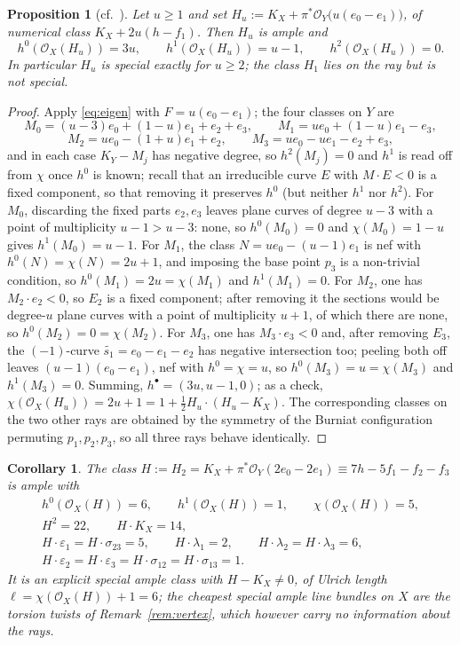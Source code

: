 \documentclass[10pt,a4paper]{amsart}
\newtheorem{proposition}[theorem]{Proposition}
\newtheorem{corollary}[theorem]{Corollary}
\newcommand{\OO}{\mathcal{O}}
\newcommand{\len}{\ell}
\begin{document}
\begin{proposition}[cf.\ {\cite[Prop.~4.27]{Cho26}}]\label{prop:ray}
Let $u\ge1$ and set $H_u:=K_X+\pi^*\OO_Y\bigl(u(e_0-e_1)\bigr)$, of numerical class $K_X+2u(h-f_1)$. Then $H_u$ is ample and
\[
h^0(\OO_X(H_u))=3u,\qquad h^1(\OO_X(H_u))=u-1,\qquad h^2(\OO_X(H_u))=0 .
\]
In particular $H_u$ is special exactly for $u\ge2$; the class $H_1$ lies on the ray but is not special.
\end{proposition}

\begin{proof}
Apply \eqref{eq:eigen} with $F=u(e_0-e_1)$; the four classes on $Y$ are
\[
M_0=(u-3)e_0+(1-u)e_1+e_2+e_3,\qquad M_1=ue_0+(1-u)e_1-e_3,
\]
\[
M_2=ue_0-(1+u)e_1+e_2,\qquad M_3=ue_0-ue_1-e_2+e_3,
\]
and in each case $K_Y-M_j$ has negative degree, so $h^2(M_j)=0$ and $h^1$ is read off from $\chi$ once $h^0$ is known; recall that an irreducible curve $E$ with $M\cdot E<0$ is a fixed component, so that removing it preserves $h^0$ (but neither $h^1$ nor $h^2$). For $M_0$, discarding the fixed parts $e_2,e_3$ leaves plane curves of degree $u-3$ with a point of multiplicity $u-1>u-3$: none, so $h^0(M_0)=0$ and $\chi(M_0)=1-u$ gives $h^1(M_0)=u-1$. For $M_1$, the class $N=ue_0-(u-1)e_1$ is nef with $h^0(N)=\chi(N)=2u+1$, and imposing the base point $p_3$ is a non-trivial condition, so $h^0(M_1)=2u=\chi(M_1)$ and $h^1(M_1)=0$. For $M_2$, one has $M_2\cdot e_2<0$, so $E_2$ is a fixed component; after removing it the sections would be degree-$u$ plane curves with a point of multiplicity $u+1$, of which there are none, so $h^0(M_2)=0=\chi(M_2)$. For $M_3$, one has $M_3\cdot e_3<0$ and, after removing $E_3$, the $(-1)$-curve $\widetilde{s_1}=e_0-e_1-e_2$ has negative intersection too; peeling both off leaves $(u-1)(e_0-e_1)$, nef with $h^0=\chi=u$, so $h^0(M_3)=u=\chi(M_3)$ and $h^1(M_3)=0$. Summing, $h^\bullet=(3u,u-1,0)$; as a check, $\chi(\OO_X(H_u))=2u+1=1+\tfrac12H_u\cdot(H_u-K_X)$. The corresponding classes on the two other rays are obtained by the symmetry of the Burniat configuration permuting $p_1,p_2,p_3$, so all three rays behave identically.
\end{proof}

\begin{corollary}\label{cor:candidate}
The class $H:=H_2=K_X+\pi^*\OO_Y(2e_0-2e_1)\equiv7h-5f_1-f_2-f_3$ is ample with
\begin{gather*}
h^0(\OO_X(H))=6,\qquad h^1(\OO_X(H))=1,\qquad \chi(\OO_X(H))=5,\\
H^2=22,\qquad H\cdot K_X=14,\\
H\cdot\varepsilon_1=H\cdot\sigma_{23}=5,\qquad
H\cdot\lambda_1=2,\qquad H\cdot\lambda_2=H\cdot\lambda_3=6,\\
H\cdot\varepsilon_2=H\cdot\varepsilon_3=H\cdot\sigma_{12}=H\cdot\sigma_{13}=1 .
\end{gather*}
It is an explicit special ample class with $H-K_X\neq0$, of Ulrich length $\len=\chi(\OO_X(H))+1=6$; the cheapest special ample line bundles on $X$ are the torsion twists of Remark~\ref{rem:vertex}, which however carry no information about the rays.
\end{corollary}
\end{document}
